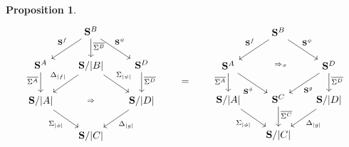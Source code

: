 \documentclass[11pt, oneside, article]{memoir}
\theoremstyle{plain}
\newtheorem{proposition}[theorem]{Proposition}
\theoremstyle{definition}
\theoremstyle{remark}
\DeclarePairedDelimiter{\abs}{\lvert}{\rvert}
\newcommand{\cat}[1]{\mathbf{#1}}
\newcommand{\CoalgOn}[2]{{#2}^{#1}}
\newcommand{\CoalgS}[1]{\CoalgOn{#1}{\bS}}
\newcommand{\pts}[1]{{\abs{#1}}}
\newcommand{\one}[1]{\pts{#1}}
\newcommand{\ptlift}[1]{\overline{#1}}
\newcommand{\carr}{\Sigma}
\newcommand{\leindex}[1]{\Sigma_{#1}}
\newcommand{\reindex}[1]{\Delta_{#1}}
\newcommand{\car}[1]{\carr^{#1}}
\newcommand{\carA}{\car{\cA}}
\newcommand{\carB}{\car{\cB}}
\newcommand{\carC}{\car{\cC}}
\newcommand{\carD}{\car{\cD}}
\newcommand{\com}[2]{{#1}^{#2}}
\newcommand{\con}[2]{{#1}^{#2}}
\newcommand{\cmnd}[1]{{#1}}
\newcommand{\cA}{\cmnd{A}}
\newcommand{\cB}{\cmnd{B}}
\newcommand{\cC}{\cmnd{C}}
\newcommand{\cD}{\cmnd{D}}
\newcommand{\bS}{\cat{S}}
\newcommand{\AS}{\CoalgS{\cA}}
\newcommand{\BS}{\CoalgS{\cB}}
\newcommand{\CS}{\CoalgS{\cC}}
\newcommand{\DS}{\CoalgS{\cD}}
\newcommand{\SA}{\bS/\pts{\cA}}
\newcommand{\SB}{\bS/\pts{\cB}}
\newcommand{\SC}{\bS/\pts{\cC}}
\newcommand{\SD}{\bS/\pts{\cD}}
\begin{document}
\begin{proposition}
\[\begin{tikzcd}[column sep=17]
      & \BS & \\
      \AS & \SB & \DS \\
      \SA && \SD \\
      & \SC
      \arrow["{\con{\bS}{f}}"'{pos=0.4}, from=1-2, to=2-1]
      \arrow["{\ptlift{\carB}}"{pos=0.4}, from=1-2, to=2-2]
      \arrow["{\com{\bS}{\psi}}"{pos=0.4}, from=1-2, to=2-3]
      \arrow["{\ptlift{\carA}}"'{pos=0.4}, from=2-1, to=3-1]
      \arrow["{\reindex{\one{f}}}"'{pos=0.4}, from=2-2, to=3-1]
      \arrow["{\leindex{\one{\psi}}}"{pos=0.4}, from=2-2, to=3-3]
      \arrow["\Rightarrow"{description}, draw=none, from=2-2, to=4-2]
      \arrow["{\ptlift{\carD}}"{pos=0.4}, from=2-3, to=3-3]
      \arrow["{\leindex{\one{\phi}}}"', from=3-1, to=4-2]
      \arrow["{\reindex{\one{g}}}", from=3-3, to=4-2]
    \end{tikzcd}
    \qquad = \qquad
    \begin{tikzcd}[column sep=17]
      & \BS & \\
      \AS && \DS \\
      \SA & \CS & \SD \\
      & \SC
      \arrow["{\con{\bS}{f}}"'{pos=0.4}, from=1-2, to=2-1]
      \arrow["{\com{\bS}{\psi}}"{pos=0.4}, from=1-2, to=2-3]
      \arrow["{\Rightarrow_\sigma}"{description}, shift left, draw=none, from=1-2, to=3-2]
      \arrow["{\ptlift{\carA}}"'{pos=0.4}, from=2-1, to=3-1]
      \arrow["{\com{\bS}{\phi}}"'{pos=0.6}, from=2-1, to=3-2]
      \arrow["{\con{\bS}{g}}"{pos=0.6}, from=2-3, to=3-2]
      \arrow["{\ptlift{\carD}}"{pos=0.4}, from=2-3, to=3-3]
      \arrow["{\leindex{\one{\phi}}}"', from=3-1, to=4-2]
      \arrow["{\ptlift{\carC}}"{pos=0.4}, from=3-2, to=4-2]
      \arrow["{\reindex{\one{g}}}", from=3-3, to=4-2]
    \end{tikzcd}
  \]
  

\end{proposition}
\end{document}

